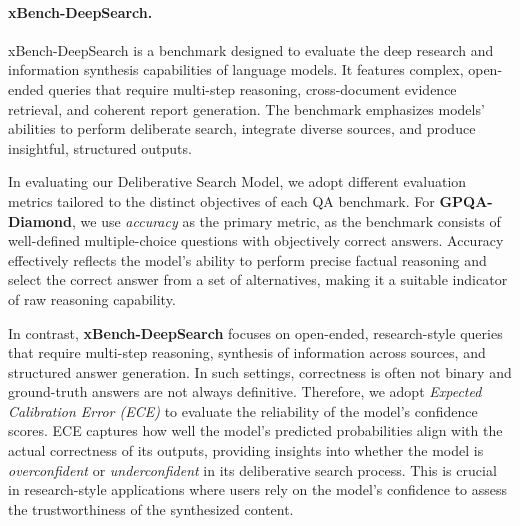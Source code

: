 \documentclass[11pt]{article}
\begin{document}
\paragraph{xBench-DeepSearch.}  
xBench-DeepSearch\cite{chen2025xbench} is a benchmark designed to evaluate the deep research and information synthesis capabilities of language models. It features complex, open-ended queries that require multi-step reasoning, cross-document evidence retrieval, and coherent report generation. The benchmark emphasizes models' abilities to perform deliberate search, integrate diverse sources, and produce insightful, structured outputs.

\vspace{0.5em}
In evaluating our Deliberative Search Model, we adopt different evaluation metrics tailored to the distinct objectives of each QA benchmark. For \textbf{GPQA-Diamond}, we use \emph{accuracy} as the primary metric, as the benchmark consists of well-defined multiple-choice questions with objectively correct answers. Accuracy effectively reflects the model's ability to perform precise factual reasoning and select the correct answer from a set of alternatives, making it a suitable indicator of raw reasoning capability.

In contrast, \textbf{xBench-DeepSearch} focuses on open-ended, research-style queries that require multi-step reasoning, synthesis of information across sources, and structured answer generation. In such settings, correctness is often not binary and ground-truth answers are not always definitive. Therefore, we adopt \emph{Expected Calibration Error (ECE)} to evaluate the reliability of the model’s confidence scores. ECE captures how well the model’s predicted probabilities align with the actual correctness of its outputs, providing insights into whether the model is \emph{overconfident} or \emph{underconfident} in its deliberative search process. This is crucial in research-style applications where users rely on the model’s confidence to assess the trustworthiness of the synthesized content.

\end{document}
